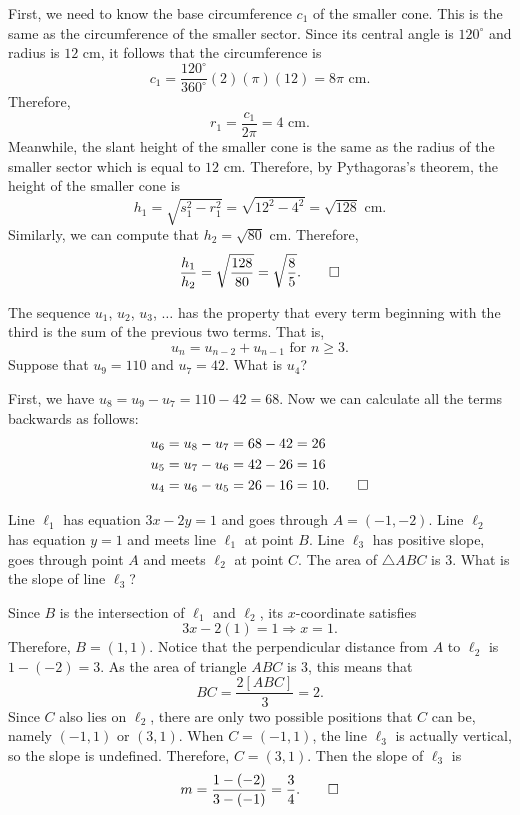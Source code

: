 \begin{solution}
\begin{center}
    \end{center}
    First, we need to know the base circumference $c_1$ of the smaller cone.
    This is the same as the circumference of the smaller sector. Since its
    central angle is $120^\circ$ and radius is $12 \text{ cm}$, it follows that
    the circumference is 
    \[ c_1 = \frac{120^\circ}{360^\circ}(2)(\pi)(12) = 8 \pi \text{ cm}. \]
    Therefore, 
    \[ r_1 = \frac{c_1}{2 \pi} = 4 \text{ cm}. \]
    Meanwhile, the slant height of the smaller cone is the same as the radius
    of the smaller sector which is equal to $12 \text{ cm}$. Therefore, by
    Pythagoras's theorem, the height of the smaller cone is 
    \[ h_1 = \sqrt{s_1^2 - r_1^2} = \sqrt{12^2 - 4^2} = \sqrt{128} \text{ cm}. \]
    Similarly, we can compute that $h_2 = \sqrt{80} \text{ cm}$. Therefore, 
    \[ \frac{h_1}{h_2} = \sqrt{\frac{128}{80}} = \sqrt{\frac{8}{5}}. \qedhere \]
\end{solution}

\begin{question}
    The sequence $u_{1}$, $u_{2}$, $u_{3}$, $\ldots$ has the property that
    every term beginning with the third is the sum of the previous two terms.
    That is,
    \[u_{n} = u_{n - 2} + u_{n - 1} \text{  for  } n \geq 3.\] 
    Suppose that $u_{9} = 110$ and $u_{7} = 42$. What is $u_{4}$?
\end{question}
\begin{solution}
    First, we have $u_8 = u_9 - u_7 = 110 - 42 = 68$. Now we can calculate all
    the terms backwards as follows:
    \begin{align*}
        u_6 &= u_8 - u_7 = 68 - 42 = 26\\
        u_5 &= u_7 - u_6 = 42 - 26 = 16\\
        u_4 &= u_6 - u_5 = 26 - 16 = 10. \qedhere
    \end{align*}
\end{solution}

\begin{question}
    Line $\ell_{1}$ has equation $3x - 2y = 1$ and goes through $A = (-1, -2)$.
    Line $\ell_{2}$ has equation $y = 1$ and meets line $\ell_{1}$ at point
    $B$. Line $\ell_{3}$ has positive slope, goes through point $A$ and meets
    $\ell_{2}$ at point $C$. The area of $\triangle ABC$ is 3. What is the slope
    of line $\ell_{3}$?
\end{question}
\begin{solution}
    Since $B$ is the intersection of $\ell_1$ and $\ell_2$, its $x$-coordinate
    satisfies
    \[ 3x - 2(1) = 1 \Longrightarrow x = 1. \]
    Therefore, $B = (1, 1)$. Notice that the perpendicular distance from $A$ to
    $\ell_2$ is $1 - (-2) = 3$. As the area of triangle $ABC$ is 3, this means
    that 
    \[ BC = \frac{2[ABC]}{3} = 2. \]
    Since $C$ also lies on $\ell_2$, there are only two possible positions that
    $C$ can be, namely $(-1, 1)$ or $(3, 1)$. When $C = (-1, 1)$, the line
    $\ell_3$ is actually vertical, so the slope is undefined. Therefore, $C =
    (3, 1)$. Then the slope of $\ell_3$ is 
    \[ m = \frac{1 - (-2)}{3 - (-1)} = \frac{3}{4}.\qedhere \]
\end{solution}

